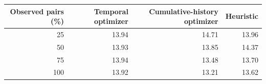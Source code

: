 \begin{tabular}{rrrr}\toprule
Observed pairs (\%) & Temporal optimizer & Cumulative-history optimizer & Heuristic \\ \midrule
25 & 13.94 & 14.71 & 13.96 \\
50 & 13.93 & 13.85 & 14.37 \\
75 & 13.94 & 13.48 & 13.70 \\
100 & 13.92 & 13.21 & 13.62 \\
\bottomrule\end{tabular}